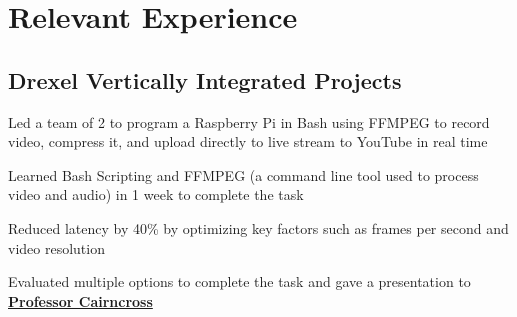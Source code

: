\documentclass[]{deedy-resume-openfont}
\begin{document}
\begin{minipage}[t]{0.66\textwidth} 


\section{Relevant Experience}

\subsection{Drexel Vertically Integrated Projects}
\vspace{\topsep} %
\begin{tightemize}
\item Led a team of 2 to program a Raspberry Pi in Bash using FFMPEG to record video, compress it, and upload directly to live stream to YouTube in real time
\item Learned Bash Scripting and FFMPEG (a command line tool used to process video and audio) in 1 week to complete the task
\item Reduced latency by 40\% by optimizing key factors such as frames per second and video resolution 
\item Evaluated multiple options to complete the task and gave a presentation to \textbf{\href{https://drexel.edu/engineering/about/faculty-staff/C/cairncross-richard/}{Professor Cairncross}}
\end{tightemize}
\sectionsep



\end{minipage}
\end{document}
